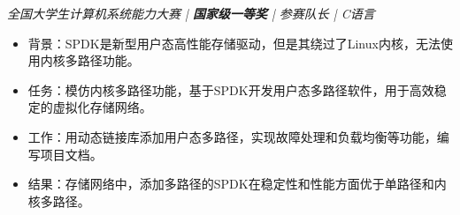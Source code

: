 \textit{全国大学生计算机系统能力大赛 | \textbf{国家级一等奖} | 参赛队长 | C语言}
\begin{itemize}
  \item 背景：SPDK是新型用户态高性能存储驱动，但是其绕过了Linux内核，无法使用内核多路径功能。
  \item 任务：模仿内核多路径功能，基于SPDK开发用户态多路径软件，用于高效稳定的虚拟化存储网络。
  \item 工作：用动态链接库添加用户态多路径，实现故障处理和负载均衡等功能，编写项目文档。
  \item 结果：存储网络中，添加多路径的SPDK在稳定性和性能方面优于单路径和内核多路径。
\end{itemize}

